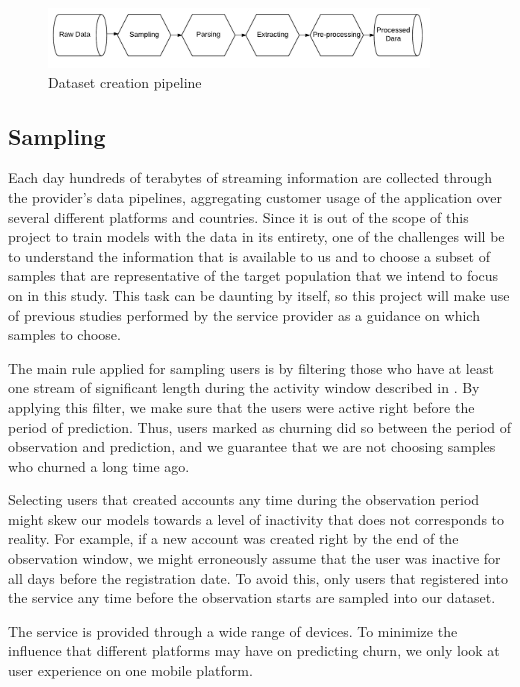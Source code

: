 \documentclass{kththesis}
\begin{document}
	\begin{figure}[h]
    \centering
    \includegraphics[width=0.9\textwidth,keepaspectratio]{figures/pipeline.pdf}
    \caption{Dataset creation pipeline}
    \label{fig:pipeline}
	\end{figure}

\subsection{Sampling}
\label{sec:sampling}

Each day hundreds of terabytes of streaming information are collected through the provider's data pipelines, aggregating customer usage of the application over several different platforms and countries. Since it is out of the scope of this project to train models with the data in its entirety, one of the challenges will be to understand the information that is available to us and to choose a subset of samples that are representative of the target population that we intend to focus on in this study. This task can be daunting by itself, so this project will make use of previous studies performed by the service provider as a guidance on which samples to choose.

The main rule applied for sampling users is by filtering those who have at least one stream of significant length during the activity window described in . By applying this filter, we make sure that the users were active right before the period of prediction. Thus, users marked as churning did so between the period of observation and prediction, and we guarantee that we are not choosing samples who churned a long time ago.

Selecting users that created accounts any time during the observation period might skew our models towards a level of inactivity that does not corresponds to reality. For example, if a new account was created right by the end of the observation window, we might erroneously assume that the user was inactive for all days before the registration date. To avoid this, only users that registered into the service any time before the observation starts are sampled into our dataset. 

The service is provided through a wide range of devices. To minimize the influence that different platforms may have on predicting churn, we only look at user experience on one mobile platform. 
\end{document}
